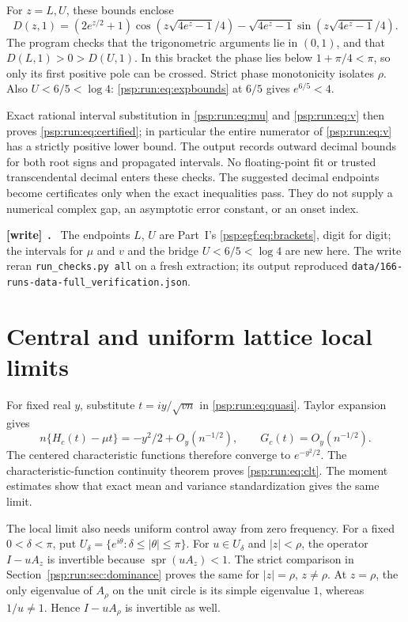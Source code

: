 \documentclass[11pt,letterpaper]{article}
\numberwithin{equation}{section}
\theoremstyle{remark}\newtheorem{remark}[theorem]{Remark}
\newcommand{\spr}{\operatorname{spr}}
\newcommand{\file}[1]{\nolinkurl{#1}}
\newenvironment{writenote}[1][]{\par\smallskip\begingroup\small
 \noindent\textbf{[write]}\if\relax\detokenize{#1}\relax\else~\textbf{#1.}\fi\ }%
 {\par\endgroup\smallskip}
\begin{document}
For $z=L,U$, these bounds enclose
\[
 D(z,1)=(2e^{z/2}+1)\cos(z\sqrt{4e^z-1}/4)
        -\sqrt{4e^z-1}\sin(z\sqrt{4e^z-1}/4).
\]
The program checks that the trigonometric arguments lie in $(0,1)$,
and that $D(L,1)>0>D(U,1)$. In this bracket the phase lies below
$1+\pi/4<\pi$, so only its first positive pole can be crossed.
Strict phase monotonicity isolates $\rho$. Also $U<6/5<\log4$:
\eqref{psp:run:eq:expbounds} at $6/5$ gives $e^{6/5}<4$.

Exact rational interval substitution in \eqref{psp:run:eq:mu} and \eqref{psp:run:eq:v}
then proves \eqref{psp:run:eq:certified}; in particular the entire numerator
of \eqref{psp:run:eq:v} has a strictly positive lower bound. The output records
outward decimal bounds for both root signs and propagated intervals.
No floating-point fit or trusted transcendental decimal enters these
checks. The suggested decimal endpoints become certificates only when
the exact inequalities pass. They do not supply a numerical complex
gap, an asymptotic error constant, or an onset index.
\begin{writenote}
The endpoints $L$, $U$ are Part~I's \eqref{psp:egf:eq:brackets}, digit for digit; the intervals for $\mu$ and $v$ and the bridge $U<6/5<\log4$ are new here. The write reran \texttt{run\_checks.py all} on a fresh extraction; its output reproduced \file{data/166-runs-data-full_verification.json}.
\end{writenote}

\section{Central and uniform lattice local limits}\label{psp:run:sec:limits}
For fixed real $y$, substitute $t=iy/\sqrt{vn}$ in \eqref{psp:run:eq:quasi}.
Taylor expansion gives
\[
 n\{H_c(t)-\mu t\}=-y^2/2+O_y(n^{-1/2}),\qquad
 G_c(t)=O_y(n^{-1/2}).
\]
The centered characteristic functions therefore converge to
$e^{-y^2/2}$. The characteristic-function continuity theorem proves
\eqref{psp:run:eq:clt}. The moment estimates show that exact mean and variance
standardization gives the same limit.

The local limit also needs uniform control away from zero frequency.
For a fixed $0<\delta<\pi$, put
$U_\delta=\{e^{i\theta}:\delta\leq|\theta|\leq\pi\}$.
For $u\in U_\delta$ and $|z|<\rho$, the operator $I-uA_z$ is invertible
because $\spr(uA_z)<1$. The strict comparison in
Section~\ref{psp:run:sec:dominance} proves the same for $|z|=\rho$, $z\ne\rho$.
At $z=\rho$, the only eigenvalue of $A_\rho$ on the unit circle is its
simple eigenvalue $1$, whereas $1/u\ne1$. Hence $I-uA_\rho$ is invertible
as well.
\end{document}
